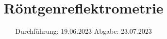 

\subject{V44}
\title{Röntgenreflektrometrie}
\date{
  Durchführung: 19.06.2023
  \hspace{3em}
  Abgabe: 23.07.2023
}
\usepackage[aux]{rerunfilecheck}

\usepackage{fontspec}
\usepackage{siunitx}

\usepackage[ngerman]{babel}

\usepackage[unicode]{hyperref}
\usepackage{bookmark}
\usepackage{booktabs}
\usepackage{import}
\usepackage{amsmath}

\usepackage{scrhack}

\usepackage[aux]{rerunfilecheck}

\usepackage{fontspec}

\usepackage[ngerman]{babel}

\usepackage{amsmath}
\usepackage{amssymb}
\usepackage{mathtools}

\usepackage{booktabs}

\usepackage[unicode]{hyperref}
\usepackage{bookmark}
\usepackage{svg}



\maketitle
\thispagestyle{empty}
\tableofcontents
\newpage










\nocite{*}
\printbibliography



